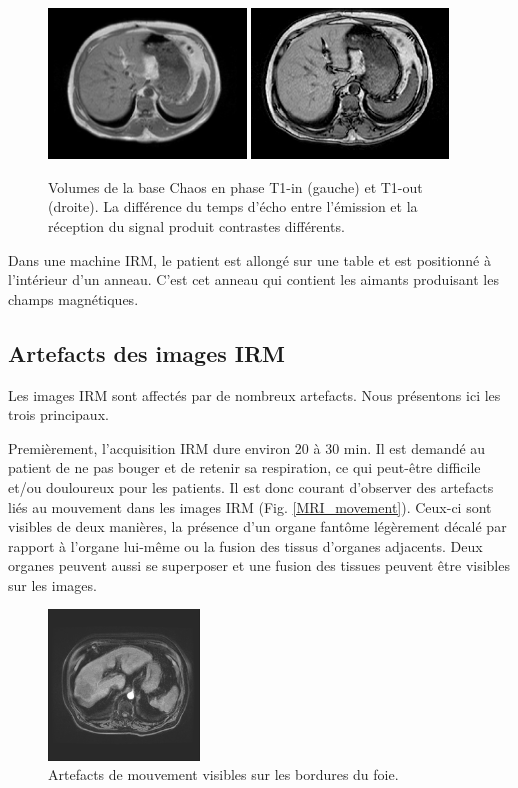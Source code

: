 \begin{figure}
    \centering
    \includegraphics[height=4cm]{Images/T1_in_phase.png}
    \includegraphics[height=4cm]{Images/T1_out_phase.png}
    \caption{Volumes de la base Chaos en phase T1-in (gauche) et T1-out (droite). La différence du temps d'écho entre l'émission et la réception du signal produit contrastes différents.}
    \label{fig:T1 MRI}
\end{figure}

Dans une machine IRM, le patient est allongé sur une table et  est positionné à l'intérieur d'un anneau. C'est cet anneau qui contient les aimants produisant les champs magnétiques.

\subsection{Artefacts des images IRM}

Les images IRM sont affectés par de nombreux artefacts. Nous présentons ici les trois principaux.

Premièrement, l'acquisition IRM dure environ 20 à 30 min. Il est demandé au patient de ne pas bouger et de retenir sa respiration, ce qui peut-être difficile et/ou douloureux pour les patients. Il est donc courant d'observer des artefacts liés au mouvement dans les images IRM (Fig. \ref{MRI_movement}). Ceux-ci sont visibles de deux manières, la présence d'un organe fantôme légèrement décalé par rapport à l'organe lui-même ou la fusion des tissus d'organes adjacents. Deux organes peuvent aussi se superposer et une fusion des tissues peuvent être visibles sur les images.

\begin{figure}
    \centering
    \includegraphics[height=4cm]{Images/MRI_movements.png}
    \caption{Artefacts de mouvement visibles sur les bordures du foie.}
    \label{fig:MRI_movement}
\end{figure}

